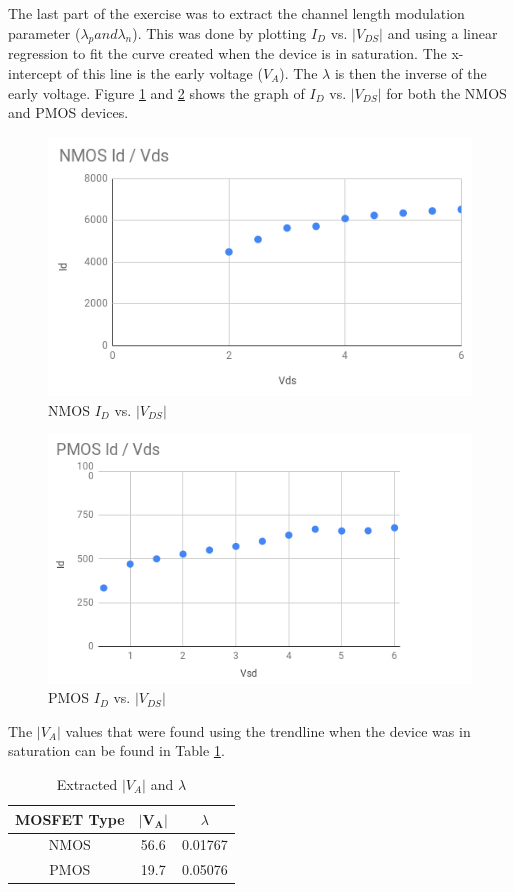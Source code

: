 \documentclass[11pt]{article}
\begin{document}
	\hfill \break

	The last part of the exercise was to extract the channel length modulation
	parameter ($\lambda_p and \lambda_n$). This was done by plotting $I_D$ vs.
	$|V_{DS}|$ and using a linear regression to fit the curve created when the
	device is in saturation. The x-intercept of this line is the early voltage
	($V_A$). The $\lambda$ is then the inverse of the early voltage. Figure
	\ref{fig:nmos_id_vs_vds} and \ref{fig:pmos_id_vs_vds} shows the graph of
	$I_D$ vs. $|V_{DS}|$ for both the NMOS and PMOS devices.

	\begin{figure}[H]
		\centering
		\includegraphics[width=4 in]{nmos_id_vds.png}
		\caption{NMOS $I_D$ vs. $|V_{DS}|$}
		\label{fig:nmos_id_vs_vds}
	\end{figure}

	\begin{figure}[H]
		\centering
		\includegraphics[width=4 in]{pmos_id_vds.png}
		\caption{PMOS $I_D$ vs. $|V_{DS}|$}
		\label{fig:pmos_id_vs_vds}
	\end{figure}

	The $|V_A|$ values that were found using the trendline when the device
	was in saturation can be found in Table \ref{table:early_voltage}.

	\begin{table}[H]
		\centering
		\caption{Extracted $|V_A|$ and $\lambda$}
		\label{table:early_voltage}
		\begin{tabular}{|c|c|c|}
			\hline
			\textbf{MOSFET Type} & \(|\mathbf{V_A}|\) & $\lambda$\\
			\hline
			NMOS & 56.6 & 0.01767\\
			PMOS & 19.7 & 0.05076\\
			\hline
		\end{tabular}
	\end{table}
\end{document}
